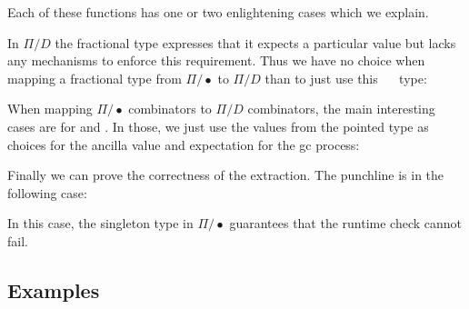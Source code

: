 \documentclass[sigplan,10pt,review,anonymous]{acmart}
\newcommand{\Acon}[1]{\AgdaInductiveConstructor{#1}}
\newcommand{\Avar}[1]{\AgdaBound{#1}}
\begin{document}
Each of these functions has one or two enlightening cases which we
explain.

In $\Pi/D$ the fractional type expresses that it expects a particular
value but lacks any mechanisms to enforce this requirement. Thus we
have no choice when mapping a fractional type from $\Pi/\bullet$ to
$\Pi/D$ than to just use this \Acon{𝟙/}~\Avar{v} ~type:

\EXTu{}


When mapping $\Pi/\bullet$ combinators to
$\Pi/D$ combinators, the main interesting cases are for \Acon{η} and
\Acon{ε}. In those, we just use the values from the pointed type as
choices for the ancilla value and expectation for the gc process:

\EXTcomb{}



Finally we can prove the correctness of the extraction. The punchline
is in the following case:

\EXTeq{}

\noindent In this case, the singleton type in $\Pi/\bullet$ guarantees that the
runtime check cannot fail.

\subsection{Examples}
\label{sec:cat}
\end{document}
